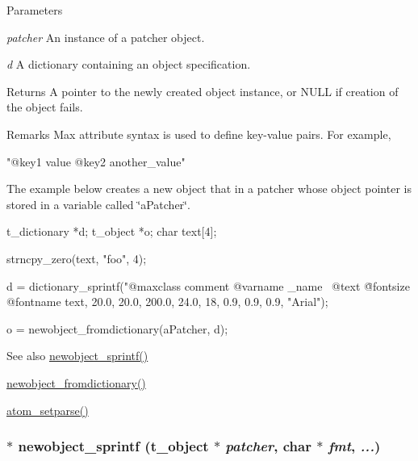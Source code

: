 \begin{DoxyParams}{Parameters}
\item[{\em patcher}]An instance of a patcher object. \item[{\em d}]A dictionary containing an object specification. \end{DoxyParams}
\begin{DoxyReturn}{Returns}
A pointer to the newly created object instance, or NULL if creation of the object fails.
\end{DoxyReturn}
\begin{DoxyRemark}{Remarks}
Max attribute syntax is used to define key-\/value pairs. For example, 
\begin{DoxyCode}
    "@key1 value @key2 another_value"
\end{DoxyCode}


The example below creates a new object that in a patcher whose object pointer is stored in a variable called \char`\"{}aPatcher\char`\"{}. 
\begin{DoxyCode}
    t_dictionary *d;
    t_object *o;
    char text[4];
    
    strncpy_zero(text, "foo", 4);

    d = dictionary_sprintf("@maxclass comment @varname _name \
        @text \"%
        @fontsize %
        @fontname %
        text, 20.0, 20.0, 200.0, 24.0,
        18, 0.9, 0.9, 0.9, "Arial");
    
    o = newobject_fromdictionary(aPatcher, d);
\end{DoxyCode}

\end{DoxyRemark}
\begin{DoxySeeAlso}{See also}
\hyperlink{group__obj_gad81c665a20c3c707decaf3403468ff47}{newobject\_\-sprintf()} 

\hyperlink{group__obj_gaed2c4e1d0c80d929b97ccf07a886faeb}{newobject\_\-fromdictionary()} 

\hyperlink{group__atom_ga55938aedb41a8f3565680cf29169dc70}{atom\_\-setparse()} 
\end{DoxySeeAlso}
\hypertarget{group__obj_gad81c665a20c3c707decaf3403468ff47}{
\subsubsection[{newobject\_\-sprintf}]{$\ast$ newobject\_\-sprintf ({\bf t\_\-object} $\ast$ {\em patcher}, \/  char $\ast$ {\em fmt}, \/   {\em ...})}}
\label{group__obj_gad81c665a20c3c707decaf3403468ff47}


